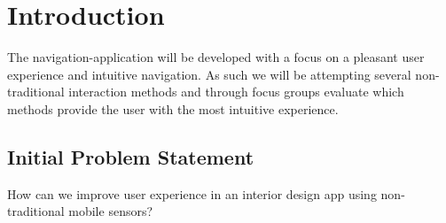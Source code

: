 \chapter{Introduction}
The navigation-application will be developed with a focus on a pleasant user experience and intuitive navigation. As such we will be attempting several non-traditional interaction methods and through focus groups evaluate which methods provide the user with the most intuitive experience.
 
\section{Initial Problem Statement}
How can we improve user experience in an interior design app using non-traditional mobile sensors?

